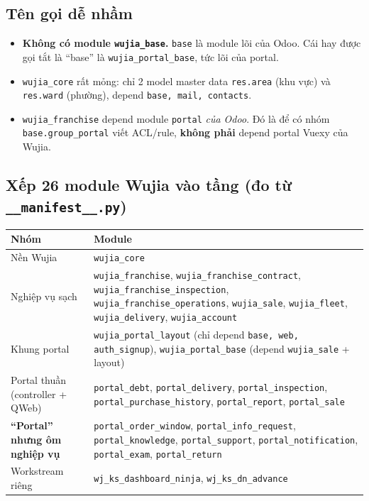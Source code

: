 \subsection*{Tên gọi dễ nhầm}

\begin{itemize}
\item \textbf{Không có module \texttt{wujia\_base}.} \texttt{base} là module lõi của Odoo. Cái
  hay được gọi tắt là ``base'' là \texttt{wujia\_portal\_base}, tức lõi của portal.
\item \texttt{wujia\_core} rất mỏng: chỉ 2 model master data \texttt{res.area} (khu vực) và
  \texttt{res.ward} (phường), depend \texttt{base, mail, contacts}.
\item \texttt{wujia\_franchise} depend module \texttt{portal} \emph{của Odoo}. Đó là để có nhóm
  \texttt{base.group\_portal} viết ACL/rule, \textbf{không phải} depend portal Vuexy của Wujia.
\end{itemize}

\subsection*{Xếp 26 module Wujia vào tầng (đo từ \texttt{\_\_manifest\_\_.py})}

\begin{center}
\small
\begin{tabularx}{\textwidth}{lX}
\toprule
\textbf{Nhóm} & \textbf{Module} \\
\midrule
Nền Wujia & \texttt{wujia\_core} \\
Nghiệp vụ sạch & \texttt{wujia\_franchise}, \texttt{wujia\_franchise\_contract},
  \texttt{wujia\_franchise\_inspection}, \texttt{wujia\_franchise\_operations},
  \texttt{wujia\_sale}, \texttt{wujia\_fleet}, \texttt{wujia\_delivery}, \texttt{wujia\_account} \\
Khung portal & \texttt{wujia\_portal\_layout} (chỉ depend \texttt{base, web, auth\_signup}),
  \texttt{wujia\_portal\_base} (depend \texttt{wujia\_sale} + layout) \\
Portal thuần (controller + QWeb) & \texttt{portal\_debt}, \texttt{portal\_delivery},
  \texttt{portal\_inspection}, \texttt{portal\_purchase\_history}, \texttt{portal\_report},
  \texttt{portal\_sale} \\
\textbf{``Portal'' nhưng ôm nghiệp vụ} & \texttt{portal\_order\_window}, \texttt{portal\_info\_request},
  \texttt{portal\_knowledge}, \texttt{portal\_support}, \texttt{portal\_notification},
  \texttt{portal\_exam}, \texttt{portal\_return} \\
Workstream riêng & \texttt{wj\_ks\_dashboard\_ninja}, \texttt{wj\_ks\_dn\_advance} \\
\bottomrule
\end{tabularx}
\end{center}

